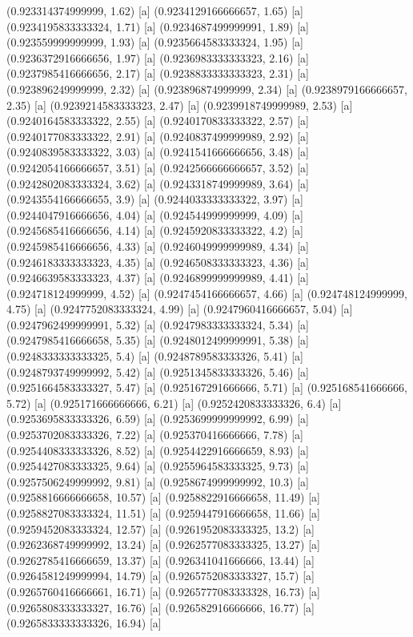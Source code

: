 {{{(0.923314374999999, 1.62) [a] 
(0.9234129166666657, 1.65) [a] 
(0.9234195833333324, 1.71) [a] 
(0.9234687499999991, 1.89) [a] 
(0.923559999999999, 1.93) [a] 
(0.9235664583333324, 1.95) [a] 
(0.9236372916666656, 1.97) [a] 
(0.9236983333333323, 2.16) [a] 
(0.9237985416666656, 2.17) [a] 
(0.9238833333333323, 2.31) [a] 
(0.923896249999999, 2.32) [a] 
(0.923896874999999, 2.34) [a] 
(0.9238979166666657, 2.35) [a] 
(0.9239214583333323, 2.47) [a] 
(0.9239918749999989, 2.53) [a] 
(0.9240164583333322, 2.55) [a] 
(0.9240170833333322, 2.57) [a] 
(0.9240177083333322, 2.91) [a] 
(0.9240837499999989, 2.92) [a] 
(0.9240839583333322, 3.03) [a] 
(0.9241541666666656, 3.48) [a] 
(0.9242054166666657, 3.51) [a] 
(0.9242566666666657, 3.52) [a] 
(0.9242802083333324, 3.62) [a] 
(0.9243318749999989, 3.64) [a] 
(0.9243554166666655, 3.9) [a] 
(0.9244033333333322, 3.97) [a] 
(0.9244047916666656, 4.04) [a] 
(0.924544999999999, 4.09) [a] 
(0.9245685416666656, 4.14) [a] 
(0.9245920833333322, 4.2) [a] 
(0.9245985416666656, 4.33) [a] 
(0.9246049999999989, 4.34) [a] 
(0.9246183333333323, 4.35) [a] 
(0.9246508333333323, 4.36) [a] 
(0.9246639583333323, 4.37) [a] 
(0.9246899999999989, 4.41) [a] 
(0.924718124999999, 4.52) [a] 
(0.9247454166666657, 4.66) [a] 
(0.924748124999999, 4.75) [a] 
(0.9247752083333324, 4.99) [a] 
(0.9247960416666657, 5.04) [a] 
(0.9247962499999991, 5.32) [a] 
(0.9247983333333324, 5.34) [a] 
(0.9247985416666658, 5.35) [a] 
(0.9248012499999991, 5.38) [a] 
(0.9248333333333325, 5.4) [a] 
(0.9248789583333326, 5.41) [a] 
(0.9248793749999992, 5.42) [a] 
(0.9251345833333326, 5.46) [a] 
(0.9251664583333327, 5.47) [a] 
(0.925167291666666, 5.71) [a] 
(0.925168541666666, 5.72) [a] 
(0.925171666666666, 6.21) [a] 
(0.9252420833333326, 6.4) [a] 
(0.9253695833333326, 6.59) [a] 
(0.9253699999999992, 6.99) [a] 
(0.9253702083333326, 7.22) [a] 
(0.925370416666666, 7.78) [a] 
(0.9254408333333326, 8.52) [a] 
(0.9254422916666659, 8.93) [a] 
(0.9254427083333325, 9.64) [a] 
(0.9255964583333325, 9.73) [a] 
(0.9257506249999992, 9.81) [a] 
(0.9258674999999992, 10.3) [a] 
(0.9258816666666658, 10.57) [a] 
(0.9258822916666658, 11.49) [a] 
(0.9258827083333324, 11.51) [a] 
(0.9259447916666658, 11.66) [a] 
(0.9259452083333324, 12.57) [a] 
(0.9261952083333325, 13.2) [a] 
(0.9262368749999992, 13.24) [a] 
(0.9262577083333325, 13.27) [a] 
(0.9262785416666659, 13.37) [a] 
(0.926341041666666, 13.44) [a] 
(0.9264581249999994, 14.79) [a] 
(0.9265752083333327, 15.7) [a] 
(0.9265760416666661, 16.71) [a] 
(0.9265777083333328, 16.73) [a] 
(0.9265808333333327, 16.76) [a] 
(0.926582916666666, 16.77) [a] 
(0.9265833333333326, 16.94) [a] 
}}}
